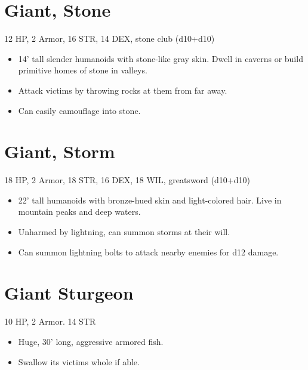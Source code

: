 \documentclass[
  10pt,
  american,
]{article}
\begin{document}
\hypertarget{giant-stone}{%
\section{Giant, Stone}\label{giant-stone}}

12 HP, 2 Armor, 16 STR, 14 DEX, stone club (d10+d10)

\begin{samepage}
\begin{itemize}
\setlength\itemsep{-.5em}
\item 14’ tall slender humanoids with stone-like gray skin.   Dwell in caverns or build primitive homes of stone in valleys.
\item Attack victims by throwing rocks at them from far away.
\item Can easily camouflage into stone.
\end{itemize}
\end{samepage}

\hypertarget{giant-storm}{%
\section{Giant, Storm}\label{giant-storm}}

18 HP, 2 Armor, 18 STR, 16 DEX, 18 WIL, greatsword (d10+d10)

\begin{samepage}
\begin{itemize}
\setlength\itemsep{-.5em}
\item 22’ tall humanoids with bronze-hued skin and light-colored hair. Live in mountain peaks and deep waters.
\item Unharmed by lightning, can summon storms at their will.
\item Can summon lightning bolts to attack nearby enemies for d12 damage.
\end{itemize}
\end{samepage}

\hypertarget{giant-sturgeon}{%
\section{Giant Sturgeon}\label{giant-sturgeon}}

10 HP, 2 Armor. 14 STR

\begin{samepage}
\begin{itemize}
\setlength\itemsep{-.5em}
\item Huge, 30’ long, aggressive armored fish.
\item Swallow its victims whole if able.
\end{itemize}
\end{samepage}
\end{document}
